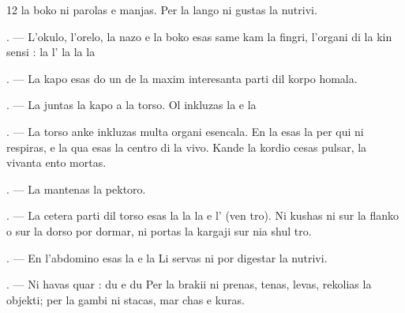 \begin{VUpage}[14]{12}
\VUcontinue
la boko ni parolas e manjas. Per la lango ni\nl
gustas la nutrivi.

. --- L'okulo, l'orelo, la nazo e la boko esas\nl
same kam la fingri, l'organi di la kin sensi : la\nl
{} l' la  la \cc
{} la 

. --- La kapo esas do un de la maxim\nl
interesanta parti dil korpo homala.

\VUsaut{4.4mm}
\VUsaut{3.0mm}

. --- La  juntas la kapo a la torso. Ol\nl
inkluzas la  e la 

. --- La torso anke inkluzas multa organi\nl
esencala. En la  esas la  per\nl
qui ni respiras, e la  qua esas la centro\nl
di la vivo. Kande la kordio cesas pulsar, la\nl
vivanta ento mortas.

. --- La  mantenas la pektoro.

. --- La cetera parti dil torso esas la\nl
{} la  la  e l' (ven\cc
tro). Ni kushas ni sur la flanko o sur la dorso\nl
por dormar, ni portas la kargaji sur nia shul\cc
tro.

. --- En l'abdomino esas la  e la\nl
{} Li servas ni por digestar la nutrivi.

\VUsaut{4.4mm}
\VUsaut{3.0mm}

. --- Ni havas quar  : du  e\nl
du  Per la brakii ni prenas, tenas, levas,\nl
rekolias la objekti; per la gambi ni stacas, mar\cc
chas e kuras.
\end{VUpage}

